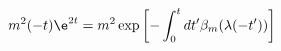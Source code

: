 \begin{equation}
m^2 (-t) \e^{2t} = m^2 \exp \left[ - \int_0^t dt' \beta_m (\lambda
(-t')) \right] \label{maindm}
\end{equation}

